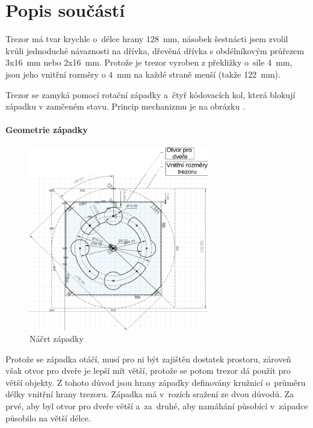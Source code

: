 \section{Popis součástí}

Trezor má tvar krychle o~délce hrany 128~mm, násobek šestnácti jsem zvolil kvůli jednoduché návaznosti na dřívka, %
dřevěná dřívka s obdélníkovým průřezem 3x16~mm nebo 2x16~mm. 
Protože je trezor vyroben z překližky o~síle 4~mm, jsou jeho vnitřní rozměry o 4~mm na každé straně menší (takže 122~mm).

Trezor se zamyká pomocí rotační západky a~čtyř kódovacích kol, která blokují západku v zamčeném stavu. 
Princip mechanizmu je na obrázku .

\paragraph{Geometrie západky}
\begin{figure}[h]
	\centering
    \includegraphics[width=0.7\textwidth]{kapitoly/obrazky/M3/geometrie_zapadky.png}
    \caption{Náčrt západky}
    \label{fig:M3-geometrie-zapadky}
\end{figure} 

Protože se západka otáčí, musí pro ni být zajištěn dostatek prostoru, zároveň však otvor pro dveře je lepší mít větší, protože se potom trezor dá použít pro větší objekty.
Z tohoto důvod jsou hrany západky definovány kružnicí o~průměru délky vnitřní hrany trezoru. Západka má v~rozích sražení ze dvou důvodů. Za prvé, aby byl otvor pro
dveře větší a~za~druhé, aby namáhání působící v~západce působilo na větší délce.

